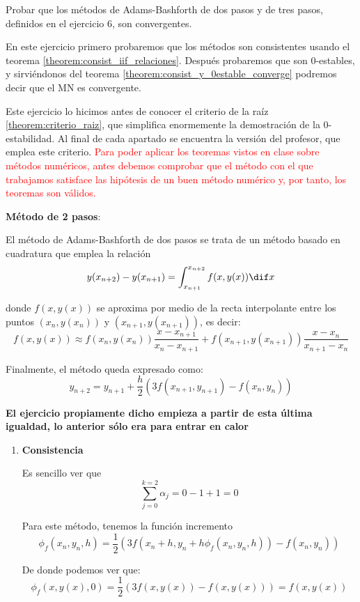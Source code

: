 \begin{problem}[8]
Probar que los métodos de Adams-Bashforth de dos pasos y de tres pasos, definidos en el ejercicio 6, son convergentes.
\solution


En este ejercicio primero probaremos que los métodos son consistentes usando el teorema \ref{theorem:consist_iif_relaciones}. Después probaremos que son 0-estables, y sirviéndonos del teorema \ref{theorem:consist_y_0estable_converge} podremos decir que el MN es convergente.

Este ejercicio lo hicimos antes de conocer el criterio de la raíz \ref{theorem:criterio_raiz}, que simplifica enormemente la demostración de la 0-estabilidad. Al final de cada apartado se encuentra la versión del profesor, que emplea este criterio.
\textcolor{red}{
\obs Para poder aplicar los teoremas vistos en clase sobre métodos numéricos, antes debemos comprobar que el método con el que trabajamos satisface las hipótesis de un buen método numérico y, por tanto, los teoremas son válidos.}

\spart \textbf{Método de 2 pasos}:

El método de Adams-Bashforth de dos pasos se trata de un método basado en cuadratura que emplea la relación
\[y(x_{n+2}) - y(x_{n+1}) = \int_{x_{n+1}}^{x_{n+2}} f(x,y(x)) \dif x\]

donde $f(x,y(x))$ se aproxima por medio de la recta interpolante entre los puntos $(x_n,y(x_n))$ y $(x_{n+1},y(x_{n+1}))$, es decir:
\[f(x,y(x)) \approx f(x_n, y(x_n)) \frac{x-x_{n+1}}{x_n-x_{n+1}}+f(x_{n+1},y(x_{n+1}))\frac{x-x_n}{x_{n+1}-x_n}\]

Finalmente, el método queda expresado como:
\[y_{n+2} = y_{n+1}+\frac{h}{2}\left( 3f(x_{n+1},y_{n+1})-f(x_n,y_n)\right)\]

\textbf{El ejercicio propiamente dicho empieza a partir de esta última igualdad, lo anterior sólo era para entrar en calor}

\begin{enumerate}
\item \textbf{Consistencia}

Es sencillo ver que \[\sum_{j=0}^{k=2} α_j = 0 - 1 + 1 = 0\]

Para este método, tenemos la función incremento
\[\phi_f(x_n,y_n,h) = \frac{1}{2}\left(3f(x_n+h,y_n+h\phi_f(x_n,y_n,h))-f(x_n,y_n)\right)\]

De donde podemos ver que:
\[\phi_f(x,y(x),0) = \frac{1}{2} \left(3f(x,y(x)) - f(x,y(x)) \right) = f(x,y(x))\]


\end{enumerate}
\end{problem}
